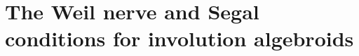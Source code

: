 
\section{The Weil nerve and Segal conditions for involution algebroids}%
\label{sec:revisiting-segal-conds}

